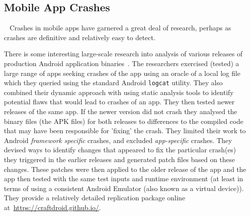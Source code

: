\subsection{Mobile App Crashes}~\label{rw-mobile-app-crashes-topic}
Crashes in mobile apps have garnered a great deal of research, perhaps as crashes are definitive and relatively easy to detect.

There is some interesting large-scale research into analysis of various releases of production Android application binaries~. The researchers exercised (tested) a large range of apps seeking crashes of the app using an oracle of a local log file which they queried using the standard Android \texttt{logcat} utility. They also combined their dynamic approach with using static analysis tools to identify potential flaws that would lead to crashes of an app. They then tested newer releases of the same app. If the newer version did not crash they analysed the binary files (the APK files) for both releases to differences to the compiled code that may have been responsible for 'fixing' the crash. They limited their work to Android \emph{framework specific} crashes, and excluded \emph{app-specific} crashes. They devised ways to identify changes that appeared to fix the particular crash(es) they triggered in the earlier releases and generated patch files based on these changes. These patches were then applied to the older release of the app and the app then tested with the same test inputs and runtime environment (at least in terms of using a consistent Android Emulator (also known as a virtual device)). They provide a relatively detailed replication package online at~\url{https://craftdroid.github.io/}.

